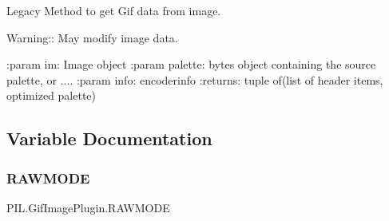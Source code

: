\begin{DoxyVerb}Legacy Method to get Gif data from image.

Warning:: May modify image data.

:param im: Image object
:param palette: bytes object containing the source palette, or ....
:param info: encoderinfo
:returns: tuple of(list of header items, optimized palette)\end{DoxyVerb}
 

\subsection{Variable Documentation}
\mbox{\label{namespacePIL_1_1GifImagePlugin_aecdec844c7e230b7a55c8f93d29ecdfd}} 
\subsubsection{\texorpdfstring{R\+A\+W\+M\+O\+DE}{RAWMODE}}
{\footnotesize\ttfamily P\+I\+L.\+Gif\+Image\+Plugin.\+R\+A\+W\+M\+O\+DE}

